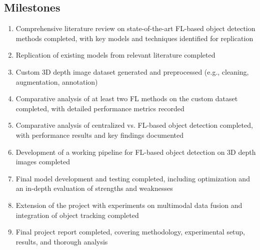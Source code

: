 \documentclass[thesis]{mas_proposal}
\begin{document}
\begin{enumerate}
\end{enumerate}

\subsection{Milestones}

\begin{enumerate}
      \item[M1] Comprehensive literature review on state-of-the-art FL-based object detection methods completed, with key models and techniques identified for replication
      \item[M2] Replication of existing models from relevant literature completed
      \item[M3] Custom 3D depth image dataset generated and preprocessed (e.g., cleaning, augmentation, annotation)
      \item[M4] Comparative analysis of at least two FL methods on the custom dataset completed, with detailed performance metrics recorded
      \item[M5] Comparative analysis of centralized vs. FL-based object detection completed, with performance results and key findings documented
      \item[M6] Development of a working pipeline for FL-based object detection on 3D depth images completed
      \item[M7] Final model development and testing completed, including optimization and an in-depth evaluation of strengths and weaknesses
      \item[M8] Extension of the project with experiments on multimodal data fusion and integration of object tracking completed
      \item[M9] Final project report completed, covering methodology, experimental setup, results, and thorough analysis
\end{enumerate}
\end{document}
